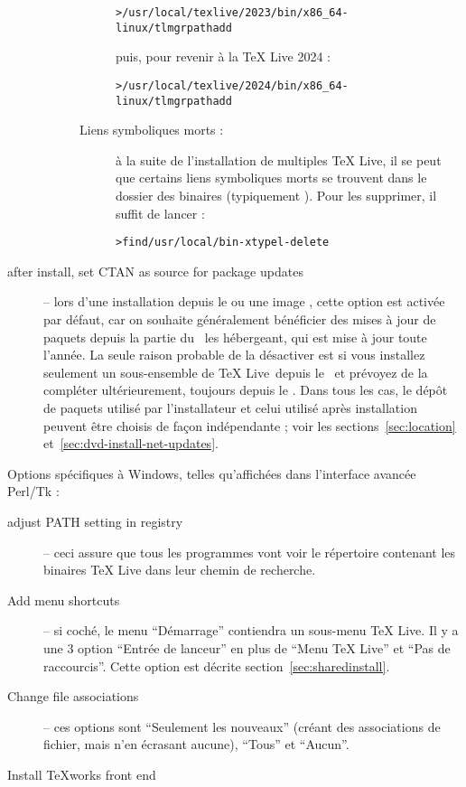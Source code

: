\documentclass[german, english, french, 12pt]{article}
\renewcommand{\TL}{\TeX{} Live\xspace}%
\begin{document}
\begin{description}
\begin{description}
\begin{description}
\begin{alltt}
> /usr/local/texlive/2023/bin/x86_64-linux/tlmgr path add
\end{alltt}
      puis, pour revenir à la \TL{} 2024 :
\begin{alltt}
> /usr/local/texlive/2024/bin/x86_64-linux/tlmgr path add
\end{alltt}
    \item[Liens symboliques morts :] à la suite de l'installation de multiples
      \TL{}, il se peut que certains liens symboliques morts se trouvent dans le
      dossier des binaires (typiquement ). Pour les
      supprimer, il suffit de lancer :
\begin{alltt}
> find /usr/local/bin -xtype l -delete
\end{alltt}
    \end{description}
  \end{description}

\item[after install, set CTAN as source for package updates] -- lors d'une
  installation depuis le \DVD{} ou une image \ISO{}, cette option est activée
  par défaut, car on souhaite généralement bénéficier des mises à jour de
  paquets depuis la partie du \CTAN\ les hébergeant, qui est mise à jour toute
  l'année. La seule raison probable de la désactiver est si vous installez
  seulement un sous-ensemble de \TL\ depuis le \DVD\ et prévoyez de la compléter
  ultérieurement, toujours depuis le \DVD. Dans tous les cas, le dépôt de
  paquets utilisé par l'installateur et celui utilisé après installation peuvent
  être choisis de façon indépendante ; voir les sections~\ref{sec:location}
  et~\ref{sec:dvd-install-net-updates}.
\end{description}

Options spécifiques à Windows, telles qu'affichées dans l'interface avancée
Perl/Tk :
\begin{description}
\item[adjust PATH setting in registry] -- ceci assure que tous les programmes
  vont voir le répertoire contenant les binaires \TL{} dans leur chemin de
  recherche.

\item[Add menu shortcuts] -- si coché, le menu \enquote{Démarrage} contiendra un
  sous-menu \TL{}. Il y a une 3\ieme{} option \enquote{Entrée de lanceur} en
  plus de \enquote{Menu \TL{}} et \enquote{Pas de raccourcis}. Cette option est
  décrite section~\ref{sec:sharedinstall}.

\item[Change file associations] -- ces options sont \enquote{Seulement les
    nouveaux} (créant des associations de fichier, mais n'en écrasant aucune),
  \enquote{Tous} et \enquote{Aucun}.

\item[Install \TeX{}works front end]
\end{description}
\end{document}
